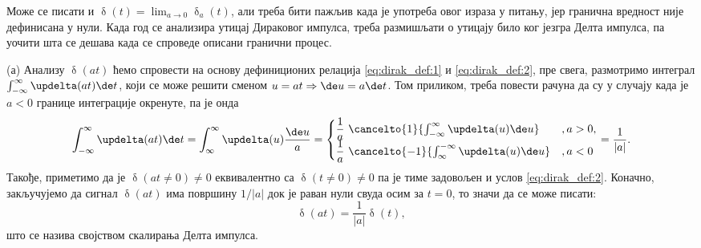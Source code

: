 \noindent
Може се писати и $\updelta(t) = \lim_{a\to 0} \updelta_a(t)$, али треба бити пажљив када је употреба овог израза у питању,
јер гранична вредност није дефинисана у нули. Када год се анализира утицај Дираковог импулса, треба размишљати о утицају
било ког језгра Делта импулса, па уочити шта се дешава када се спроведе описани гранични процес. 

(а) Анализу $\updelta(at)$ ћемо спровести на основу дефиниционих релација \eqref{eq:dirak_def:1} и \eqref{eq:dirak_def:2},
пре свега, размотримо интеграл $\int_{-\infty}^{\infty} \updelta(at) \de t$, који се може решити сменом 
$u = at \Rightarrow \de u = a \de t$. Том приликом, треба повести рачуна да су у случају када је $a<0$ границе интеграције окренуте, па је онда 
\begin{equation}
    \int_{-\infty}^{\infty} \updelta(at) \de t = 
    \int_{\-\infty}^{\infty} \updelta(u) \dfrac{\de u}{a} 
    = 
    \begin{cases}
    \dfrac{1}{a} \,\, \cancelto{1}{\int_{-\infty}^{\infty} \updelta(u) \de u} &, a > 0, \\
    \dfrac{1}{a} \,\, \cancelto{-1}{\int_{\infty}^{-\infty} \updelta(u) \de u} &, a < 0
    \end{cases}
    = \dfrac{1}{|a|}.
\end{equation}
Такође, приметимо да је $\updelta(at \neq 0) \neq 0$ еквивалентно са $\updelta(t \neq 0) \neq 0$ па је тиме задовољен и 
услов \eqref{eq:dirak_def:2}. Коначно, закључујемо да сигнал $\updelta(at)$ има површину $1/|a|$ док је раван нули свуда
осим за $t=0$, то значи да се може писати: 
\begin{equation}
    \updelta(at) = \dfrac{1}{|a|} \updelta(t), 
\end{equation}
што се назива својством скалирања Делта импулса. 

